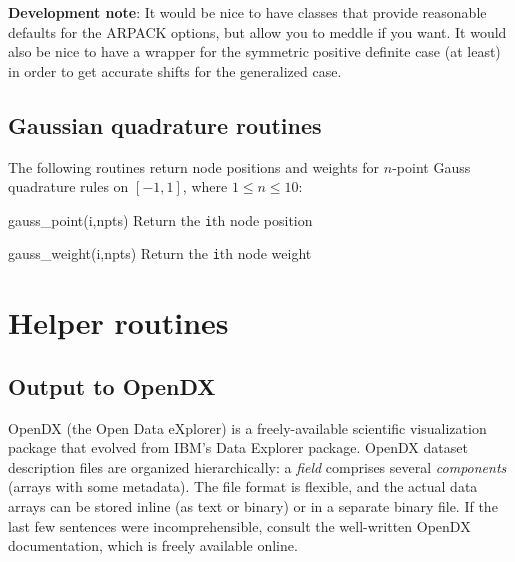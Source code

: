 \documentclass{article}
\newcommand{\devnote}[1]{%
  \begin{trivlist}
  \item\textbf{Development note}: #1
  \end{trivlist}}
\newenvironment{codelist}[1][\quad]%
  {\begin{list}{}{%
   \settowidth{\labelwidth}{\texttt{#1}\hfil}%
   \setlength{\leftmargin}{\labelwidth}%
   \addtolength{\leftmargin}{\labelsep}%
   \addtolength{\leftmargin}{\parindent}%
   \renewcommand{\makelabel}[1]{\texttt{##1}}}}%
  {\end{list}}
\newcommand{\ttt}[1]{\texttt{#1}}
\begin{document}
\devnote{It would be nice to have classes that provide reasonable
  defaults for the ARPACK options, but allow you to meddle if you
  want.  It would also be nice to have a wrapper for the symmetric
  positive definite case (at least) in order to get accurate shifts
  for the generalized case.
}


\subsection{Gaussian quadrature routines}

The following routines return node positions and weights for $n$-point
Gauss quadrature rules on $[-1,1]$, where $1 \leq n \leq 10$:
\begin{codelist}[gauss\_weight(i, npts)]
  \item[gauss\_point(i,npts)]   Return the \ttt{i}th node position
  \item[gauss\_weight(i,npts)]  Return the \ttt{i}th node weight
\end{codelist}



\section{Helper routines}


\subsection{Output to OpenDX}
\label{section-opendx}

OpenDX (the Open Data eXplorer) is a freely-available scientific
visualization package that evolved from IBM's Data Explorer package.
OpenDX dataset description files are organized hierarchically: a
\emph{field} comprises several \emph{components} (arrays with some
metadata).  The file format is flexible, and the actual data arrays
can be stored inline (as text or binary) or in a separate binary
file.  If the last few sentences were incomprehensible, consult the
well-written OpenDX documentation, which is freely available online.
\end{document}
